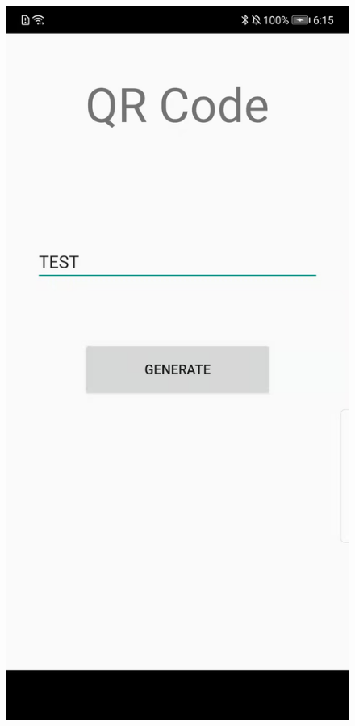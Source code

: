 \documentclass[12pt, a4paper]{article}
\theoremstyle{definition}
\begin{document}
\begin{figure}[htbp]
\begin{minipage}[t]{0.25\linewidth}
		\end{minipage}%
		\begin{minipage}[t]{0.25\linewidth}
		\centering
		\includegraphics[width=\linewidth]{5-2.jpeg}

\end{minipage}
\end{figure}
\end{document}
